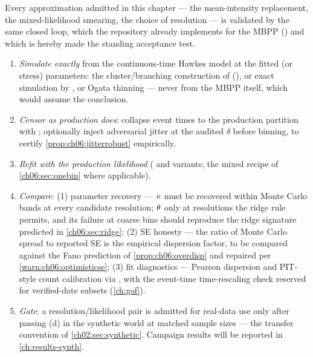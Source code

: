 Every approximation admitted in this chapter --- the mean-intensity
replacement, the mixed-likelihood smearing, the choice of resolution ---
is validated by the same closed loop, which the repository already
implements for the MBPP () and which is
hereby made the standing acceptance test.

\begin{protocol}\label{prot:ch06:icloop}
\leavevmode
\begin{enumerate}[label=(\alph*)]
\item \emph{Simulate exactly} from the continuous-time Hawkes model at the
fitted (or stress) parameters: the cluster/branching construction of
\citet{hawkesoakes1974} (), or exact
simulation by \citet{dassioszhao2013}, or Ogata thinning
\citep{ogata1981,lewisshedler1979} --- never from the MBPP itself, which
would assume the conclusion.
\item \emph{Censor as production does}: collapse event times to the
production partition with ; optionally inject
adversarial jitter at the audited $\delta$ before binning, to certify
\cref{prop:ch06:jitterrobust} empirically.
\item \emph{Refit with the production likelihood}
( and variants; the mixed recipe of
\cref{ch06:sec:onebin} where applicable).
\item \emph{Compare}: (1) parameter recovery --- $\kappa$ must be
recovered within Monte Carlo bands at every candidate resolution;
$\theta$ only at resolutions the ridge rule permits, and its failure at
coarse bins should reproduce the ridge signature predicted in
\cref{ch06:sec:ridge}; (2) SE honesty --- the ratio of Monte Carlo spread to
reported SE is the empirical dispersion factor, to be compared against the
Fano prediction of \cref{prop:ch06:overdisp} and repaired per
\cref{warn:ch06:optimisticse}; (3) fit diagnostics --- Pearson dispersion
and PIT-style count calibration \citep{czado2009} via
, with the event-time time-rescaling check
\citep{brown2002} reserved for verified-date subsets
(\cref{ch:gof}).
\item \emph{Gate}: a resolution/likelihood pair is admitted for real-data
use only after passing (d) in the synthetic world at matched sample sizes
--- the transfer convention of \cref{ch02:sec:synthetic}. Campaign
results will be reported in \cref{ch:results-synth}.
\end{enumerate}
\end{protocol}

